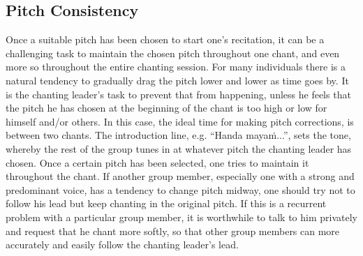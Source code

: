 \subsection*{Pitch Consistency}
\begin{justify}
  Once a suitable pitch has been chosen to start one's recitation, it can be a challenging task to maintain the chosen pitch throughout one chant, and even more so throughout the entire chanting session. For many individuals there is a natural tendency to gradually drag the pitch lower and lower as time goes by. It is the chanting leader's task to prevent that from happening, unless he feels that the pitch he has chosen at the beginning of the chant is too high or low for himself and/or others. In this case, the ideal time for making pitch corrections, is between two chants. The introduction line, e.g. ``Handa mayaṁ...'', sets the tone, whereby the rest of the group tunes in at whatever pitch the chanting leader has chosen. Once a certain pitch has been selected, one tries to maintain it throughout the chant. If another group member, especially one with a strong and predominant voice, has a tendency to change pitch midway, one should try not to follow his lead but keep chanting in the original pitch. If this is a recurrent problem with a particular group member, it is worthwhile to talk to him privately and request that he chant more softly, so that other group members can more accurately and easily follow the chanting leader's lead.
\end{justify}

